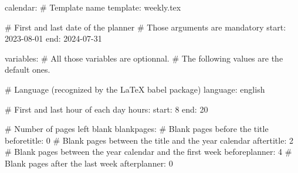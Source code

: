 calendar:
  # Template name
  template: weekly.tex

  # First and last date of the planner
  # Those arguments are mandatory
  start: 2023-08-01
  end: 2024-07-31

variables:
  # All those variables are optionnal.
  # The following values are the default ones.

  # Language (recognized by the LaTeX babel package)
  language: english

  # First and last hour of each day
  hours:
    start: 8
    end: 20

  # Number of pages left blank
  blankpages:
    # Blank pages before the title
    beforetitle: 0
    # Blank pages between the title and the year calendar
    aftertitle: 2
    # Blank pages between the year calendar and the first week
    beforeplanner: 4
    # Blank pages after the last week
    afterplanner: 0
